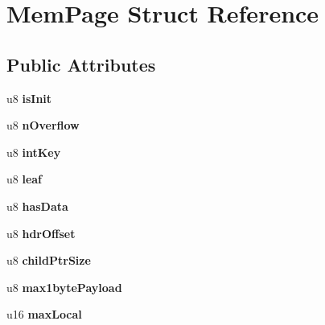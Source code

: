 \hypertarget{struct_mem_page}{\section{Mem\-Page Struct Reference}
\label{struct_mem_page}
}
\subsection*{Public Attributes}
\begin{DoxyCompactItemize}
\item 
\hypertarget{struct_mem_page_a3ab4ace46245be0fb2fb19eaa2862019}{u8 {\bfseries is\-Init}}\label{struct_mem_page_a3ab4ace46245be0fb2fb19eaa2862019}

\item 
\hypertarget{struct_mem_page_a3f7fa1a1eba3af840ef887e8ddd6d2cc}{u8 {\bfseries n\-Overflow}}\label{struct_mem_page_a3f7fa1a1eba3af840ef887e8ddd6d2cc}

\item 
\hypertarget{struct_mem_page_a46784c3c4708c7a582cff81a29c55323}{u8 {\bfseries int\-Key}}\label{struct_mem_page_a46784c3c4708c7a582cff81a29c55323}

\item 
\hypertarget{struct_mem_page_af18504bd0a2e7d39d9b485d434af0447}{u8 {\bfseries leaf}}\label{struct_mem_page_af18504bd0a2e7d39d9b485d434af0447}

\item 
\hypertarget{struct_mem_page_af7b608d25c2e326f82cc270cd53dd8f8}{u8 {\bfseries has\-Data}}\label{struct_mem_page_af7b608d25c2e326f82cc270cd53dd8f8}

\item 
\hypertarget{struct_mem_page_a01967a1a593980fb71c8ccf3393ae156}{u8 {\bfseries hdr\-Offset}}\label{struct_mem_page_a01967a1a593980fb71c8ccf3393ae156}

\item 
\hypertarget{struct_mem_page_aeba10281fc255d9bbc0e31486f8fbd48}{u8 {\bfseries child\-Ptr\-Size}}\label{struct_mem_page_aeba10281fc255d9bbc0e31486f8fbd48}

\item 
\hypertarget{struct_mem_page_a79548547cafb0e6d8549006bdc553f0a}{u8 {\bfseries max1byte\-Payload}}\label{struct_mem_page_a79548547cafb0e6d8549006bdc553f0a}

\item 
\hypertarget{struct_mem_page_a36394b7c3abf4652e7a24be4ab314f13}{u16 {\bfseries max\-Local}}\label{struct_mem_page_a36394b7c3abf4652e7a24be4ab314f13}


\end{DoxyCompactItemize}
